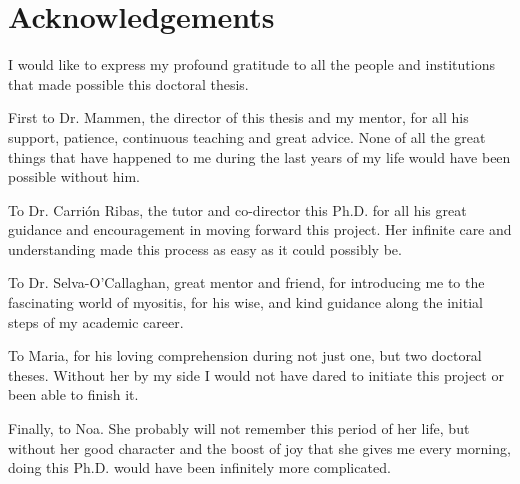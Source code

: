 \chapter*{Acknowledgements}
\thispagestyle{empty}
I would like to express my profound gratitude to all the people and institutions that made possible this doctoral thesis.

First to Dr. Mammen, the director of this thesis and my mentor, for all his support, patience, continuous teaching and great advice. None of all the great things that have happened to me during the last years of my life would have been possible without him.

To Dr. Carrión Ribas, the tutor and co-director this Ph.D. for all his great guidance and encouragement in moving forward this project. Her infinite care and understanding made this process as easy as it could possibly be.

To Dr. Selva-O'Callaghan, great mentor and friend, for introducing me to the fascinating world of myositis, for his wise, and kind guidance along the initial steps of my academic career.

To Maria, for his loving comprehension during not just one, but two doctoral theses. Without her by my side I would not have dared to initiate this project or been able to finish it.

Finally, to Noa. She probably will not remember this period of her life, but without her good character and the boost of joy that she gives me every morning, doing this Ph.D. would have been infinitely more complicated.
